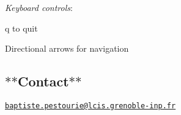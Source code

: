{\itshape Keyboard controls}\+:
\begin{DoxyItemize}
\item q to quit
\item Directional arrows for navigation
\end{DoxyItemize}

\subsection*{$\ast$$\ast$\+Contact$\ast$$\ast$}

\href{mailto:baptiste.pestourie@lcis.grenoble-inp.fr}{\tt baptiste.\+pestourie@lcis.\+grenoble-\/inp.\+fr} 